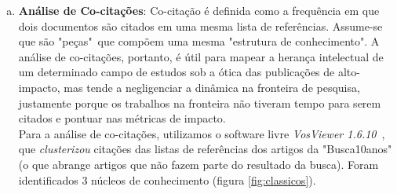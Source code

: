 \documentclass[sigconf]{acmart}
\begin{document}
\begin{enumerate}[a)]
  \item{\textbf{Análise de Co-citações}: Co-citação é definida como a frequência em que dois documentos são citados em uma mesma lista de referências. Assume-se que são "peças"~que compõem uma mesma "estrutura de conhecimento".  A análise de co-citações, portanto, é útil para mapear a herança intelectual de um determinado campo de estudos sob a ótica das publicações de alto-impacto, mas tende a negligenciar a dinâmica na fronteira de pesquisa\cite{Vogel2012}, justamente porque os trabalhos na fronteira não tiveram tempo para serem citados e pontuar nas métricas de impacto.\\Para a análise de co-citações, utilizamos o software livre \emph{VosViewer 1.6.10}~\cite{VOSviewer}, que \emph{clusterizou} citações das listas de referências dos artigos da "Busca10anos" (o que abrange artigos que não fazem parte do resultado da busca). Foram identificados 3 núcleos de conhecimento (figura \ref{fig:classicos}).
  }


\end{enumerate}
\end{document}
